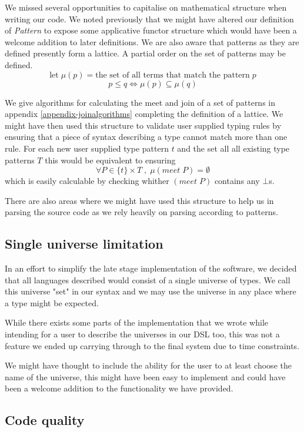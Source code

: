 We missed several opportunities
to capitalise on mathematical structure when writing our
code. We noted previously that we might have altered 
our definition of \emph{Pattern} to expose some applicative functor
structure which would have been a welcome addition to later
definitions. We are also aware that patterns as they are defined
presently form a lattice. A partial order on the set of patterns may
be defined.
$$
\mbox{let} \;μ(p) = \mbox{the set of all terms that match the pattern}\;p
$$
$$
p \leq q \iff \mu (p) \subseteq  \mu (q)
$$

We give algorithms for calculating the meet and join of a set of
patterns in appendix \ref{appendix-joinalgorithms} completing the
definition of a lattice. We might have then used this structure to
validate user supplied typing rules by ensuring that a piece of syntax
describing a type cannot match more than one rule. For each new user
supplied type pattern $t$ and the set all all existing type patterns $T$
this would be equivalent to ensuring
$$
\forall P \in \{t\} × T \;,\; \mu (meet \; P) = \emptyset
$$
which is easily calculable by checking whither $(meet \; P)$ contains
any $\bot$s.

There are also areas where we might have used this structure to help
us in parsing the source code as we rely heavily on parsing according
to patterns.

\subsection{Single universe limitation}

In an effort to simplify the late stage implementation of the
software, we decided that all languages described would consist of a
single universe of types. We call this universe "set" in our syntax
and we may use the universe in any place where a type might be
expected.

While there exists some parts of the implementation that we wrote
while intending for a user to describe the universes in our DSL too,
this was not a feature we ended up carrying through to the final
system due to time constraints.

We might have thought to include the ability for the user to at least
choose the name of the universe, this might have been easy to
implement and could have been a welcome addition to the functionality
we have provided.

\subsection{Code quality}

